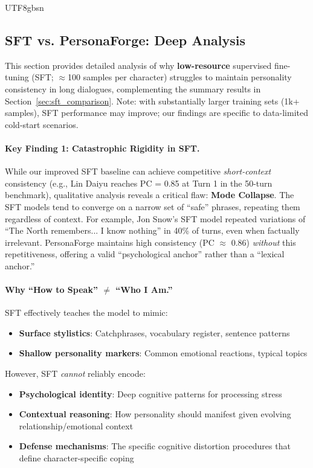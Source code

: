 \documentclass[11pt]{article}
\begin{document}
\begin{CJK*}{UTF8}{gbsn}
\subsection{SFT vs. PersonaForge: Deep Analysis}
\label{sec:sft_analysis}

This section provides detailed analysis of why \textbf{low-resource} supervised fine-tuning (SFT; $\approx$100 samples per character) struggles to maintain personality consistency in long dialogues, complementing the summary results in Section~\ref{sec:sft_comparison}. Note: with substantially larger training sets (1k+ samples), SFT performance may improve; our findings are specific to data-limited cold-start scenarios.

\paragraph{Key Finding 1: Catastrophic Rigidity in SFT.} While our improved SFT baseline can achieve competitive \textit{short-context} consistency (e.g., Lin Daiyu reaches PC = 0.85 at Turn 1 in the 50-turn benchmark), qualitative analysis reveals a critical flaw: \textbf{Mode Collapse}. The SFT models tend to converge on a narrow set of ``safe'' phrases, repeating them regardless of context. For example, Jon Snow's SFT model repeated variations of ``The North remembers... I know nothing'' in 40\% of turns, even when factually irrelevant. PersonaForge maintains high consistency (PC $\approx$ 0.86) \textit{without} this repetitiveness, offering a valid ``psychological anchor'' rather than a ``lexical anchor.''

\paragraph{Why ``How to Speak'' $\neq$ ``Who I Am.''} SFT effectively teaches the model to mimic:
\begin{itemize}
    \item \textbf{Surface stylistics}: Catchphrases, vocabulary register, sentence patterns
    \item \textbf{Shallow personality markers}: Common emotional reactions, typical topics
\end{itemize}
However, SFT \textit{cannot} reliably encode:
\begin{itemize}
    \item \textbf{Psychological identity}: Deep cognitive patterns for processing stress
    \item \textbf{Contextual reasoning}: How personality should manifest given evolving relationship/emotional context
    \item \textbf{Defense mechanisms}: The specific cognitive distortion procedures that define character-specific coping
\end{itemize}


\end{CJK*}
\end{document}
